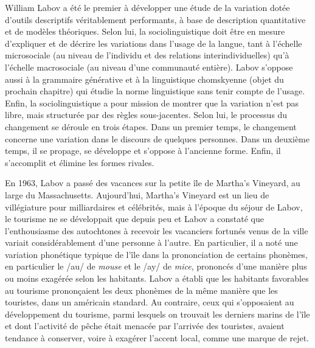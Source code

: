 William Labov a été le premier à développer une étude de la variation dotée d’outils descriptifs véritablement performants, à base de description quantitative et de modèles théoriques. Selon lui, la sociolinguistique doit être en mesure d’expliquer et de décrire les variations dans l’usage de la langue, tant à l’échelle microsociale (au niveau de l’individu et des relations interindividuelles) qu’à l’échelle macrosociale (au niveau d’une communauté entière). Labov s’oppose aussi à la grammaire générative et à la linguistique chomskyenne (objet du prochain chapitre) qui étudie la norme linguistique sans tenir compte de l’usage. Enfin, la sociolinguistique a pour mission de montrer que la variation n’est pas libre, mais structurée par des règles sous-jacentes. Selon lui, le processus du changement se déroule en trois étapes. Dans un premier temps, le changement concerne une variation dans le discours de quelques personnes. Dans un deuxième temps, il se propage, se développe et s’oppose à l’ancienne forme. Enfin, il s’accomplit et élimine les formes rivales.

En 1963, Labov a passé des vacances sur la petite île de Martha’s Vineyard, au large du Massachusetts. Aujourd’hui, Martha’s Vineyard est un lieu de villégiature pour milliardaires et célébrités, mais à l’époque du séjour de Labov, le tourisme ne se développait que depuis peu et Labov a constaté que l’enthousiasme des autochtones à recevoir les vacanciers fortunés venus de la ville variait considérablement d’une personne à l’autre. En particulier, il a noté une variation phonétique typique de l’île dans la prononciation de certains phonèmes, en particulier le /au/ de \textit{mouse} et le /ay/ de \textit{mice}, prononcés d’une manière plus ou moins exagérée selon les habitants. Labov a établi que les habitants favorables au tourisme prononçaient les deux phonèmes de la même manière que les touristes, dans un américain standard. Au contraire, ceux qui s’opposaient au développement du tourisme, parmi lesquels on trouvait les derniers marins de l’île et dont l’activité de pêche était menacée par l’arrivée des touristes, avaient tendance à conserver, voire à exagérer l’accent local, comme une marque de rejet.

